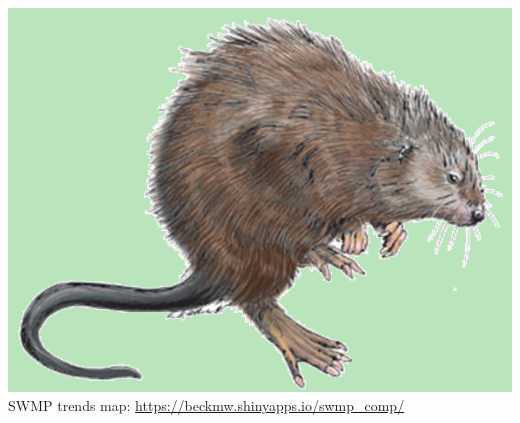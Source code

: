 \documentclass[serif]{beamer}\usepackage[]{graphicx}\usepackage[]{color}
\begin{document}
\begin{frame}[t, fragile]{\includegraphics[width=0.05\paperwidth]{fig/muskrat.png}\hspace{0.07in}{\bf SWMPrats.net: Widgets}}
SWMP trends map: \href{https://beckmw.shinyapps.io/swmp_comp/}{https://beckmw.shinyapps.io/swmp\_comp/}\\~\\
\centerline{}
\end{frame}
\end{document}
